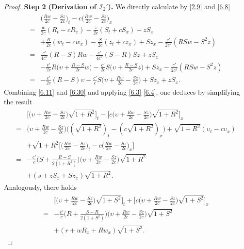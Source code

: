 \documentclass[10pt,a4paper]{amsart}
\newcommand{\fr}{\frac}
\begin{document}
\begin{proof}
\textbf{Step 2 (Derivation of $\mathcal{I}_{2}'$).} We directly calculate by \eqref{2.9} and \eqref{6.8}
\begin{align}\label{6.30}
\begin{split}
&\Big(\fr{Rw}{2c}-\fr{Sz}{2c}\Big)_t-c\Big(\fr{Rw}{2c}-\fr{Sz}{2c}\Big)_x \\
=&\fr{w}{2c}(R_t-cR_x)-\fr{z}{2c}(S_t+cS_x) +zS_x \\
&+\fr{R}{2c}(w_t-cw_x) -\fr{S}{2c}(z_t+cz_x) +Sz_x -\fr{c'}{2c^2}(RSw-S^2z) \\
=&\fr{c'}{4c^2}(R-S)Rw -\fr{c'}{4c^2}(S-R)Sz +zS_x \\
&-\fr{c'}{2c}R\Big(\upsilon+\fr{R-S}{2c}w\Big) -\fr{c'}{2c}S\Big(\upsilon+\fr{R-S}{2c}z\Big) +Sz_x-\fr{c'}{2c^2}(RSw-S^2z) \\
=&-\fr{c'}{2c}(R-S)\upsilon -\fr{c'}{c}S\Big(\upsilon+\fr{Rw}{2c}-\fr{Sz}{2c}\Big)+Sz_x+zS_x.
\end{split}
\end{align}
Combining \eqref{6.11} and \eqref{6.30} and applying \eqref{6.3}-\eqref{6.4}, one deduces by
simplifying the result
\begin{align}\label{6.31}
\begin{split}
&\Big[\Big(\upsilon+\fr{Rw}{2c}-\fr{Sz}{2c}\Big)\sqrt{1+R^2}\Big]_t -\Big[c\Big(\upsilon+\fr{Rw}{2c}-\fr{Sz}{2c}\Big)\sqrt{1+R^2}\Big]_x \\
=&\Big(\upsilon+\fr{Rw}{2c}-\fr{Sz}{2c}\Big)\Big((\sqrt{1+R^2})_t-(c\sqrt{1+R^2})_x\Big) +\sqrt{1+R^2}(\upsilon_t-c\upsilon_x) \\ &+\sqrt{1+R^2}\Big[\Big(\fr{Rw}{2c}-\fr{Sz}{2c}\Big)_t-c\Big(\fr{Rw}{2c}-\fr{Sz}{2c}\Big)_x\Big]
 \\
=&-\fr{c'}{c}\Big(S+\fr{R-S}{2(1+R^2)}\Big)\Big(\upsilon+\fr{Rw}{2c}-\fr{Sz}{2c}\Big)\sqrt{1+R^2} \\
&+ (s+zS_x +Sz_x)\sqrt{1+R^2}.
\end{split}
\end{align}
Analogously, there holds
\begin{align}\label{6.32}
\begin{split}
&\Big[\Big(\upsilon+\fr{Rw}{2c}-\fr{Sz}{2c}\Big)\sqrt{1+S^2}\Big]_t +\Big[c\Big(\upsilon+\fr{Rw}{2c}-\fr{Sz}{2c}\Big)\sqrt{1+S^2}\Big]_x \\
=&-\fr{c'}{c}\Big(R+\fr{S-R}{2(1+S^2)}\Big)\Big(\upsilon+\fr{Rw}{2c}-\fr{Sz}{2c}\Big)\sqrt{1+S^2} \\
&+ (r+wR_x +Rw_x)\sqrt{1+S^2}.
\end{split}
\end{align}

\end{proof}
\end{document}
